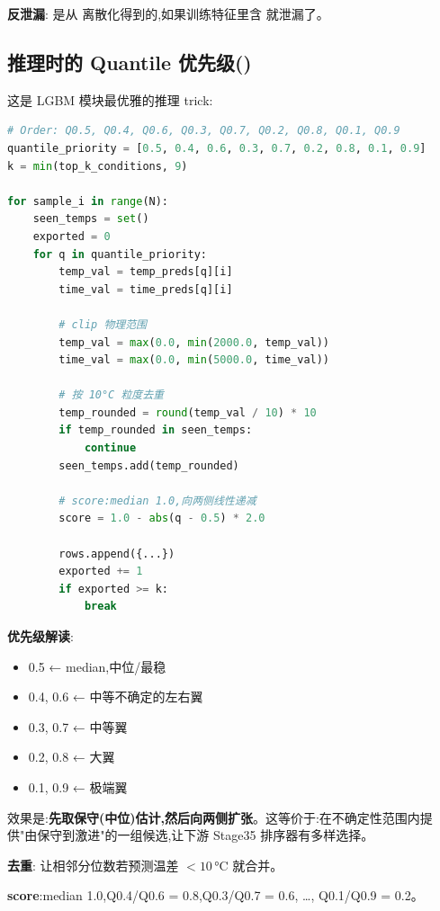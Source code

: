 \textbf{反泄漏}: 是从  离散化得到的,如果训练特征里含  就泄漏了。

\subsection{推理时的 Quantile 优先级()}

这是 LGBM 模块最优雅的推理 trick:

\begin{lstlisting}[language=Python]
# Order: Q0.5, Q0.4, Q0.6, Q0.3, Q0.7, Q0.2, Q0.8, Q0.1, Q0.9
quantile_priority = [0.5, 0.4, 0.6, 0.3, 0.7, 0.2, 0.8, 0.1, 0.9]
k = min(top_k_conditions, 9)

for sample_i in range(N):
    seen_temps = set()
    exported = 0
    for q in quantile_priority:
        temp_val = temp_preds[q][i]
        time_val = time_preds[q][i]

        # clip 物理范围
        temp_val = max(0.0, min(2000.0, temp_val))
        time_val = max(0.0, min(5000.0, time_val))

        # 按 10°C 粒度去重
        temp_rounded = round(temp_val / 10) * 10
        if temp_rounded in seen_temps:
            continue
        seen_temps.add(temp_rounded)

        # score:median 1.0,向两侧线性递减
        score = 1.0 - abs(q - 0.5) * 2.0

        rows.append({...})
        exported += 1
        if exported >= k:
            break
\end{lstlisting}

\textbf{优先级解读}:
\begin{itemize}
    \item 0.5 ← median,中位/最稳
    \item 0.4, 0.6 ← 中等不确定的左右翼
    \item 0.3, 0.7 ← 中等翼
    \item 0.2, 0.8 ← 大翼
    \item 0.1, 0.9 ← 极端翼
\end{itemize}

效果是:\textbf{先取保守(中位)估计,然后向两侧扩张}。这等价于:在不确定性范围内提供"由保守到激进"的一组候选,让下游 Stage35 排序器有多样选择。

\textbf{去重}: 让相邻分位数若预测温差 $< 10$\,°C 就合并。

\textbf{score}:median 1.0,Q0.4/Q0.6 = 0.8,Q0.3/Q0.7 = 0.6, \dots, Q0.1/Q0.9 = 0.2。

